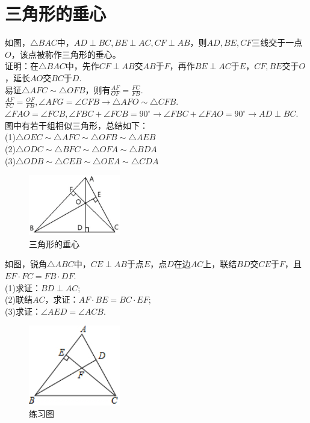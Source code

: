 \documentclass{ecnuthesis}
\begin{document}
\section{三角形的垂心}
\begin{model}
    如图，$\triangle BAC$中，$AD\perp BC,BE\perp AC,CF\perp AB$，则$AD,BE,CF$三线交于一点$O$，该点被称作三角形的垂心。\\
    证明：在$\triangle BAC$中，先作$CF\perp AB$交$AB$于$F$，再作$BE\perp AC$于$E$，$CF,BE$交于$O$，延长$AO$交$BC$于$D$. \\
    易证$\triangle AFC\sim \triangle OFB$，则有$\frac{AF}{OF}=\frac{FC}{FB}.$ \\
    $\frac{AF}{FC}=\frac{OF}{FB},\angle AFG=\angle CFB\rightarrow \triangle AFO \sim \triangle  CFB.$ \\
    $\angle FAO=\angle FCB, \angle FBC+\angle FCB=90^\circ \rightarrow \angle FBC+\angle FAO=90^\circ \rightarrow AD\perp BC.$ \\
    图中有若干组相似三角形，总结如下： \\
    (1)$\triangle OEC \sim \triangle AFC \sim \triangle OFB \sim \triangle AEB $ \\
    (2)$\triangle ODC \sim \triangle BFC \sim \triangle OFA \sim \triangle BDA $ \\
    (3)$\triangle ODB \sim \triangle CEB \sim \triangle OEA \sim \triangle CDA $ \\
\end{model}
\begin{figure}[H]
\centering
\includegraphics[width=4cm]{picture/814.png}
\caption{三角形的垂心}
\end{figure}
\begin{problem}
    如图，锐角$\triangle ABC$中，$CE\perp AB$于点$E$，点$D$在边$AC$上，联结$BD$交$CE$于$F$，且$EF·FC=FB·DF$. \\
    (1)求证：$BD\perp AC$; \\
    (2)联结$AC$，求证：$AF·BE=BC·EF$; \\
    (3)求证：$\angle AED=\angle ACB$. \\
\end{problem}
\begin{figure}[H]
\centering
\includegraphics[width=4cm]{picture/815.png}
\caption{练习图}
\end{figure}
\clearpage
\end{document}
